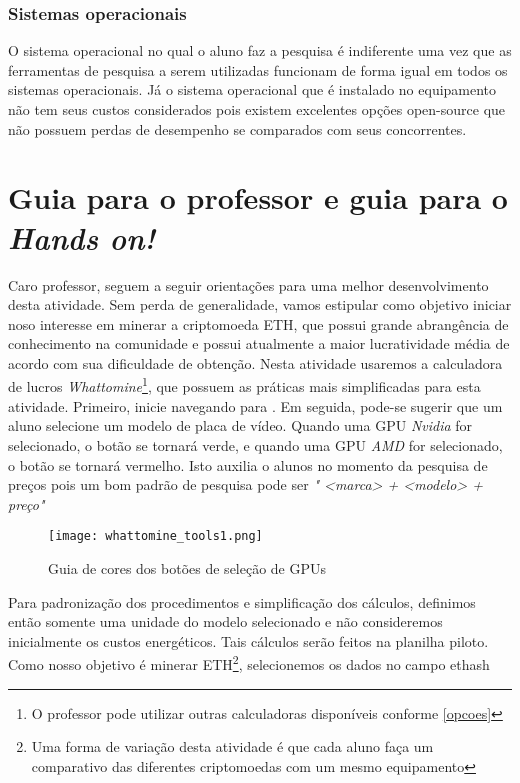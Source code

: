 \subsubsection{Sistemas operacionais} 
O sistema operacional no qual o aluno faz a pesquisa é indiferente uma vez que as ferramentas de pesquisa a serem utilizadas funcionam de forma igual em todos os sistemas operacionais. Já o sistema operacional que é instalado no equipamento não tem seus custos considerados pois existem excelentes opções open-source que não possuem perdas de desempenho se comparados com seus concorrentes. 

\section{Guia para o professor e guia para o \textit{Hands on!}} \label{profguide}

Caro professor, seguem a seguir orientações para uma melhor desenvolvimento desta atividade. Sem perda de generalidade, vamos estipular como objetivo iniciar noso interesse em minerar a criptomoeda ETH, que possui grande abrangência de conhecimento na comunidade e possui atualmente a maior lucratividade média de acordo com sua dificuldade de obtenção. Nesta atividade usaremos a calculadora de lucros \textit{Whattomine}\footnote{O professor pode utilizar outras calculadoras disponíveis conforme \ref{opcoes}}, que possuem as práticas mais simplificadas para esta atividade.  Primeiro, inicie navegando para \cite{WTM} . Em seguida, pode-se sugerir que um aluno selecione um modelo de placa de vídeo. Quando uma GPU \textit{Nvidia} for selecionado, o botão se tornará verde, e quando uma GPU \textit{AMD}  for selecionado, o botão se tornará vermelho. Isto auxilia o alunos no momento da pesquisa de preços pois um bom padrão de pesquisa pode ser \textit{" <marca> + <modelo> + preço"}
 
\begin{figure}[H]
	\centering
	\caption{Guia de cores dos botões de seleção de GPUs}
	\texttt{[image: whattomine\_tools1.png]}\\
	
\end{figure}

Para padronização dos procedimentos e simplificação dos cálculos, definimos então somente uma unidade do modelo selecionado e não consideremos inicialmente os custos energéticos. Tais cálculos serão feitos na planilha piloto. Como nosso objetivo é minerar ETH\footnote{Uma forma de variação desta atividade é que cada aluno faça um comparativo das diferentes criptomoedas com um mesmo equipamento}, selecionemos os dados no campo ethash 

